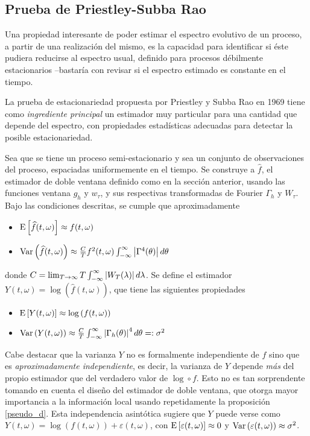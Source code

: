 
\subsection{Prueba de Priestley-Subba Rao}

Una propiedad interesante de poder estimar el espectro evolutivo de un proceso, a partir de una 
realización del mismo, es la capacidad para identificar si éste pudiera reducirse al espectro 
usual, definido para procesos débilmente estacionarios --bastaría con revisar si el espectro 
estimado es constante en el tiempo.

La prueba de estacionariedad propuesta por Priestley y Subba Rao en 1969 \cite{Priestley69} tiene 
como \textit{ingrediente principal} un estimador muy particular para una cantidad que depende del 
espectro, con propiedades estadísticas adecuadas para detectar la posible estacionariedad.

Sea \xt que se tiene un proceso semi-estacionario y sea \xtd un conjunto de observaciones del 
proceso, espaciadas uniformemente en el tiempo.
Se construye a $\widehat{f}$, el estimador de doble ventana definido como en la sección anterior,
usando las funciones ventana $g_h$ y $w_\tau$, y sus respectivas transformadas de Fourier 
$\Gamma_h$ y $W_\tau$. Bajo las condiciones descritas, se cumple que aproximadamente
%
\begin{itemize}
\item $\mathrm{E}\left[ \widehat{f}(t,\omega) \right] \approx f(t,\omega)$
\item $\mathrm{Var}\left( \widehat{f}(t,\omega) \right) \approx 
\frac{C}{T} f^{2}(t,\omega) \int_{-\infty}^{\infty} \left| \Gamma^{4}(\theta) \right| d\theta$
\end{itemize}
%
donde $C = \lim_{T\rightarrow \infty} T \int_{-\infty}^{\infty} \left| W_T(\lambda) \right| d\lambda$.
Se define el estimador $Y(t,\omega) = \log\left(\widehat{f}(t,\omega)\right)$, que tiene 
las siguientes propiedades
%
\begin{itemize}
\item $\mathrm{E}\left[ Y(t,\omega) \right] \approx \log\left(f(t,\omega)\right)$
\item $\mathrm{Var}\left( Y(t,\omega) \right) \approx 
\frac{C}{T} \int_{-\infty}^{\infty} \left| \Gamma_h(\theta) \right|^{4} d\theta =: \sigma^{2}$
\end{itemize}
%

Cabe destacar que la varianza $Y$ no es formalmente independiente de $f$ sino que es 
\textit{aproximadamente independiente}, es decir, la varianza de $Y$ depende \textit{más} 
del propio estimador que del verdadero valor de $\log\circ f$.
Esto no es tan sorprendente tomando en cuenta el diseño del estimador de doble ventana, que otorga 
mayor importancia a la información local usando repetidamente la proposición \ref{pseudo_d}. Esta 
independencia asintótica sugiere que $Y$ puede verse como
%
$Y(t,\omega) = \log\left(f(t,\omega) \right) + \varepsilon(t,\omega)$,
%
con $\mathrm{E}\left[ \varepsilon(t,\omega) \right] \approx 0$ y $\mathrm{Var}\left( \varepsilon(t,\omega) \right) \approx \sigma^{2}$.

